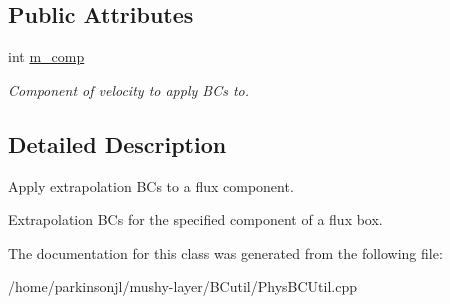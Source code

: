 \subsection*{Public Attributes}
\begin{DoxyCompactItemize}
\item 
\hypertarget{class_basic_flux_extrap_b_c_function_ad57cef41aad080d3997f5ecebd2936e1}{int \hyperlink{class_basic_flux_extrap_b_c_function_ad57cef41aad080d3997f5ecebd2936e1}{m\-\_\-comp}}\label{class_basic_flux_extrap_b_c_function_ad57cef41aad080d3997f5ecebd2936e1}

\begin{DoxyCompactList}\small\item\em Component of velocity to apply B\-Cs to. \end{DoxyCompactList}\end{DoxyCompactItemize}


\subsection{Detailed Description}
Apply extrapolation B\-Cs to a flux component. 

Extrapolation B\-Cs for the specified component of a flux box. 

The documentation for this class was generated from the following file\-:\begin{DoxyCompactItemize}
\item 
/home/parkinsonjl/mushy-\/layer/\-B\-Cutil/Phys\-B\-C\-Util.\-cpp\end{DoxyCompactItemize}
